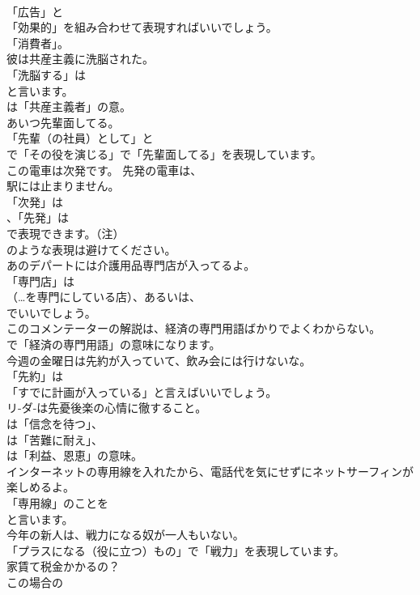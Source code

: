 \documentclass[8pt]{extreport}
\begin{document}
\begin{CJK}{UTF8}{min}
\\	「広告」と
\\	「効果的」を組み合わせて表現すればいいでしょう。
\\	「消費者」。	
\\	彼は共産主義に洗脳された。 
\\	「洗脳する」は 
\\	と言います。
\\	は「共産主義者」の意。	
\\	あいつ先輩面してる。 
\\	「先輩（の社員）として」と
\\	で「その役を演じる」で「先輩面してる」を表現しています。	
\\	この電車は次発です。 先発の電車は、
\\	駅には止まりません。 
\\	「次発」は 
\\	、「先発」は 
\\	で表現できます。（注）
\\	のような表現は避けてください。	
\\	あのデパートには介護用品専門店が入ってるよ。 
\\	「専門店」は
\\	（…を専門にしている店）、あるいは、
\\	でいいでしょう。	
\\	このコメンテーターの解説は、経済の専門用語ばかりでよくわからない。 
\\	で「経済の専門用語」の意味になります。	
\\	今週の金曜日は先約が入っていて、飲み会には行けないな。 
\\	「先約」は
\\	「すでに計画が入っている」と言えばいいでしょう。	
\\	リ-ダ-は先憂後楽の心情に徹すること。 
\\	は「信念を待つ」、
\\	は「苦難に耐え」、
\\	は「利益、恩恵」の意味。	
\\	インターネットの専用線を入れたから、電話代を気にせずにネットサーフィンが楽しめるよ。 
\\	「専用線」のことを
\\	と言います。	
\\	今年の新人は、戦力になる奴が一人もいない。 
\\	「プラスになる（役に立つ）もの」で「戦力」を表現しています。	
\\	家賃て税金かかるの？ 
\\	この場合の 

\end{CJK}
\end{document}
